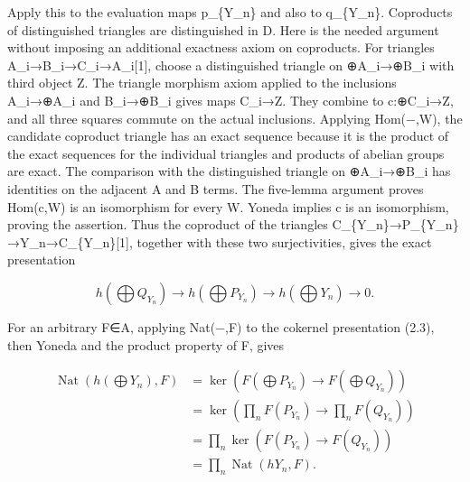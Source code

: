 \documentclass[11pt]{article}
\begin{document}
Apply this to the evaluation maps p\_\allowbreak{}\{Y\_\allowbreak{}n\} and also to q\_\allowbreak{}\{Y\_\allowbreak{}n\}. Coproducts of distinguished triangles are distinguished in D. Here is the needed argument without imposing an additional exactness axiom on coproducts. For triangles A\_\allowbreak{}i\allowbreak{}→B\_\allowbreak{}i\allowbreak{}→C\_\allowbreak{}i\allowbreak{}→A\_\allowbreak{}i[1]\allowbreak{},\allowbreak{} choose a distinguished triangle on \allowbreak{}⊕A\_\allowbreak{}i\allowbreak{}→\allowbreak{}⊕B\_\allowbreak{}i with third object Z. The triangle morphism axiom applied to the inclusions A\_\allowbreak{}i\allowbreak{}→\allowbreak{}⊕A\_\allowbreak{}i and B\_\allowbreak{}i\allowbreak{}→\allowbreak{}⊕B\_\allowbreak{}i gives maps C\_\allowbreak{}i\allowbreak{}→Z. They combine to c:\allowbreak{}\allowbreak{}⊕C\_\allowbreak{}i\allowbreak{}→Z,\allowbreak{} and all three squares commute on the actual inclusions. Applying Hom(−,\allowbreak{}W)\allowbreak{},\allowbreak{} the candidate coproduct triangle has an exact sequence because it is the product of the exact sequences for the individual triangles and products of abelian groups are exact. The comparison with the distinguished triangle on \allowbreak{}⊕A\_\allowbreak{}i\allowbreak{}→\allowbreak{}⊕B\_\allowbreak{}i has identities on the adjacent A and B terms. The five-lemma argument proves Hom(c,\allowbreak{}W)\allowbreak{} is an isomorphism for every W. Yoneda implies c is an isomorphism,\allowbreak{} proving the assertion. Thus the coproduct of the triangles C\_\allowbreak{}\{Y\_\allowbreak{}n\}\allowbreak{}→P\_\allowbreak{}\{Y\_\allowbreak{}n\}\allowbreak{}→Y\_\allowbreak{}n\allowbreak{}→C\_\allowbreak{}\{Y\_\allowbreak{}n\}[1]\allowbreak{},\allowbreak{} together with these two surjectivities,\allowbreak{} gives the exact presentation

\[
 h(\bigoplus Q_{Y_n})\longrightarrow
 h(\bigoplus P_{Y_n})\longrightarrow
 h(\bigoplus Y_n)\longrightarrow0. \tag{2.3}
\]

For an arbitrary F\allowbreak{}∈A,\allowbreak{} applying Nat(−,\allowbreak{}F)\allowbreak{} to the cokernel presentation (2.3)\allowbreak{},\allowbreak{} then Yoneda and the product property of F,\allowbreak{} gives

\[
\begin{aligned}
 \operatorname{Nat}(h(\bigoplus Y_n),F)
  &=\ker\left(F(\bigoplus P_{Y_n})\to F(\bigoplus Q_{Y_n})\right)\\
  &=\ker\left(\prod_n F(P_{Y_n})\to\prod_n F(Q_{Y_n})\right)\\
  &=\prod_n\ker\left(F(P_{Y_n})\to F(Q_{Y_n})\right)\\
  &=\prod_n\operatorname{Nat}(hY_n,F).
\end{aligned}
\]
\end{document}
